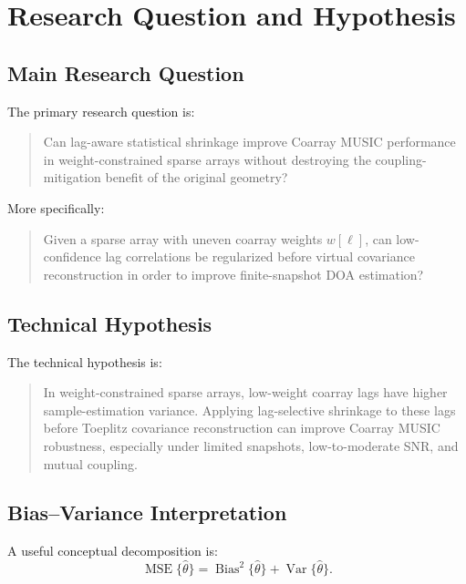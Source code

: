 \documentclass[11pt,letterpaper]{article}
\begin{document}
\section{Research Question and Hypothesis}

\subsection{Main Research Question}

The primary research question is:

\begin{quote}
Can lag-aware statistical shrinkage improve Coarray MUSIC performance in weight-constrained sparse arrays without destroying the coupling-mitigation benefit of the original geometry?
\end{quote}

More specifically:

\begin{quote}
Given a sparse array with uneven coarray weights $w[\ell]$, can low-confidence lag correlations be regularized before virtual covariance reconstruction in order to improve finite-snapshot DOA estimation?
\end{quote}

\subsection{Technical Hypothesis}

The technical hypothesis is:

\begin{quote}
In weight-constrained sparse arrays, low-weight coarray lags have higher sample-estimation variance. Applying lag-selective shrinkage to these lags before Toeplitz covariance reconstruction can improve Coarray MUSIC robustness, especially under limited snapshots, low-to-moderate SNR, and mutual coupling.
\end{quote}

\subsection{Bias--Variance Interpretation}

A useful conceptual decomposition is:
\begin{equation}
    \operatorname{MSE}\{\hat{\theta}\}
    = \operatorname{Bias}^2\{\hat{\theta}\} + \operatorname{Var}\{\hat{\theta}\} .
\end{equation}
\end{document}

